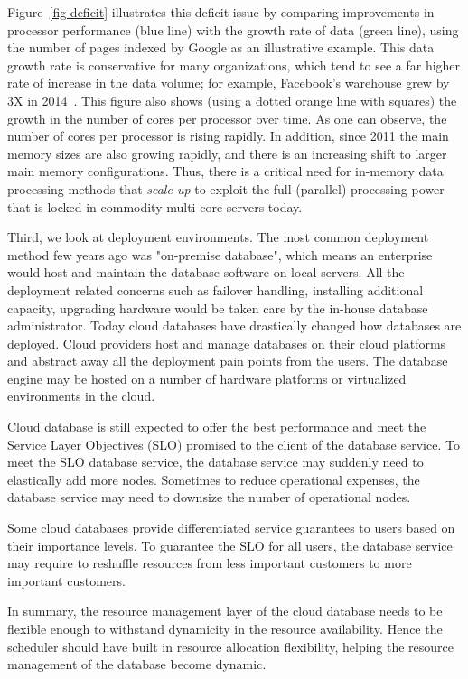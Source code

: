 Figure~\ref{fig-deficit} illustrates this deficit issue by comparing improvements in processor performance (blue line) with the growth rate of data (green line), using the number of pages indexed by Google as an illustrative example. This data growth rate is conservative for many organizations, which tend to see a far higher rate of increase in the data volume; for example, Facebook's warehouse grew by 3X in 2014~\cite{fb-growth-14}. This figure also shows (using a dotted orange line with squares) the growth in the number of cores per processor over time. As one can observe, the number of cores per processor is rising rapidly. %
In addition, %
since 2011 the main memory sizes are also growing rapidly, and there is an increasing shift to larger main memory configurations. Thus, there is a critical need for in-memory data processing methods that \textit{scale-up} to exploit the full (parallel) processing power that is locked in commodity multi-core servers today.

Third, we look at deployment environments. 
The most common deployment method few years ago was "on-premise database", which means an enterprise would host and maintain the database software on local servers. 
All the deployment related concerns such as failover handling, installing additional capacity, upgrading hardware would be taken care by the in-house database administrator. 
Today cloud databases have drastically changed how databases are deployed.
Cloud providers host and manage databases on their cloud platforms and abstract away all the deployment pain points from the users.
The database engine may be hosted on a number of hardware platforms or virtualized environments in the cloud.

Cloud database is still expected to offer the best performance and meet the Service Layer Objectives (SLO) promised to the client of the database service. 
To meet the SLO database service, the database service may suddenly need to elastically add more nodes. Sometimes to reduce operational expenses, the database service may need to downsize the number of operational nodes.

Some cloud databases provide differentiated service guarantees to users based on their importance levels. 
To guarantee the SLO for all users, the database service may require to reshuffle resources from less important customers to more important customers. 

In summary, the resource management layer of the cloud database needs to be flexible enough to withstand dynamicity in the resource availability.
Hence the scheduler should have built in resource allocation flexibility, helping the resource management of the database become dynamic.